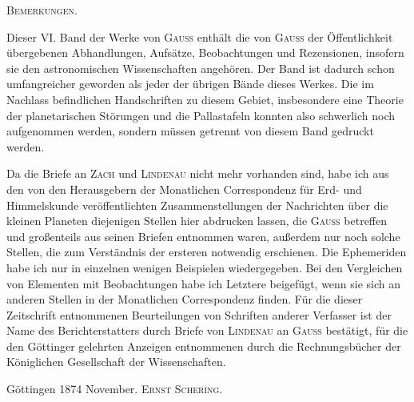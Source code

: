 \clearpage
{}
\hypertarget{native-659-lower}{}
\begin{center}\textsc{Bemerkungen.}\end{center}

Dieser VI. Band der Werke von \textsc{Gauss} enthält die von \textsc{Gauss} der Öffentlichkeit übergebenen Abhandlungen, Aufsätze, Beobachtungen und Rezensionen, insofern sie den astronomischen Wissenschaften angehören.
Der Band ist dadurch schon umfangreicher geworden als jeder der übrigen Bände dieses Werkes.
Die im Nachlass befindlichen Handschriften zu diesem Gebiet, insbesondere eine Theorie der planetarischen Störungen und die Pallastafeln konnten also schwerlich noch aufgenommen werden, sondern müssen getrennt von diesem Band gedruckt werden.

Da die Briefe an \textsc{Zach} und \textsc{Lindenau} nicht mehr vorhanden sind, habe ich aus den von den Herausgebern der Monatlichen Correspondenz für Erd- und Himmelskunde veröffentlichten Zusammenstellungen der Nachrichten über die kleinen Planeten diejenigen Stellen hier abdrucken lassen, die \textsc{Gauss} betreffen und großenteils aus seinen Briefen entnommen waren, außerdem nur noch solche Stellen, die zum Verständnis der ersteren notwendig erschienen.
Die Ephemeriden habe ich nur in einzelnen wenigen Beispielen wiedergegeben.
Bei den Vergleichen von Elementen mit Beobachtungen habe ich Letztere beigefügt, wenn sie sich an anderen Stellen in der Monatlichen Correspondenz finden.
Für die dieser Zeitschrift entnommenen Beurteilungen von Schriften anderer Verfasser ist der Name des Berichterstatters durch Briefe von \textsc{Lindenau} an \textsc{Gauss} bestätigt, für die den Göttinger gelehrten Anzeigen entnommenen durch die Rechnungsbücher der Königlichen Gesellschaft der Wissenschaften.

Göttingen 1874 November. \hfill \textsc{Ernst Schering}.
